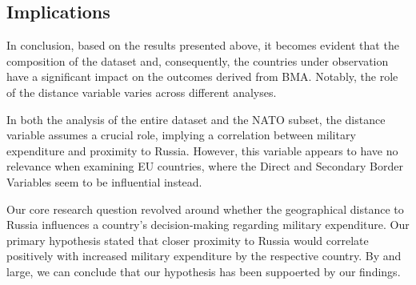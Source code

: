 \documentclass[12pt,a4paper]{article}
\begin{document}
\subsection{Implications}

In conclusion, based on the results presented above, it becomes evident that the composition of the dataset and, consequently, the countries under observation have a significant impact on the outcomes derived from BMA. Notably, the role of the distance variable varies across different analyses. 

In both the analysis of the entire dataset and the NATO subset, the distance variable assumes a crucial role, implying a correlation between military expenditure and proximity to Russia. However, this variable appears to have no relevance when examining EU countries, where the Direct and Secondary Border Variables seem to be influential instead.

Our core research question revolved around whether the geographical distance to Russia influences a country's decision-making regarding military expenditure. Our primary hypothesis stated that closer proximity to Russia would correlate positively with increased military expenditure by the respective country. By and large, we can conclude that our hypothesis has been suppoerted by our findings. \\
\end{document}
